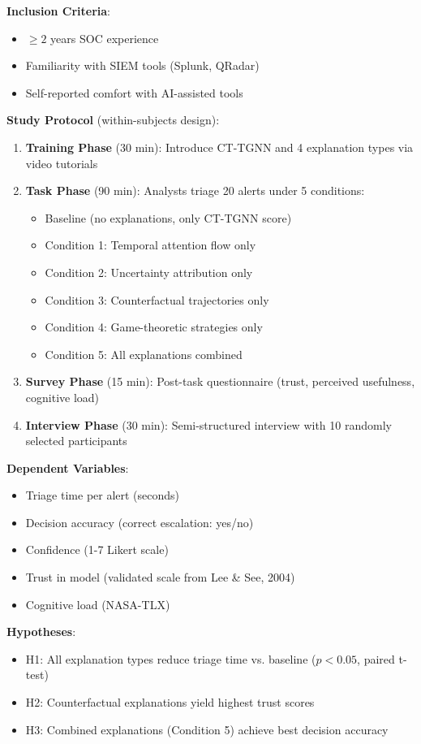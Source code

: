 \documentclass[11pt]{article}
\begin{document}
\textbf{Inclusion Criteria}:
\begin{itemize}
    \item $\geq 2$ years SOC experience
    \item Familiarity with SIEM tools (Splunk, QRadar)
    \item Self-reported comfort with AI-assisted tools
\end{itemize}

\textbf{Study Protocol} (within-subjects design):

\begin{enumerate}
    \item \textbf{Training Phase} (30 min): Introduce CT-TGNN and 4 explanation types via video tutorials
    \item \textbf{Task Phase} (90 min): Analysts triage 20 alerts under 5 conditions:
    \begin{itemize}
        \item Baseline (no explanations, only CT-TGNN score)
        \item Condition 1: Temporal attention flow only
        \item Condition 2: Uncertainty attribution only
        \item Condition 3: Counterfactual trajectories only
        \item Condition 4: Game-theoretic strategies only
        \item Condition 5: All explanations combined
    \end{itemize}
    \item \textbf{Survey Phase} (15 min): Post-task questionnaire (trust, perceived usefulness, cognitive load)
    \item \textbf{Interview Phase} (30 min): Semi-structured interview with 10 randomly selected participants
\end{enumerate}

\textbf{Dependent Variables}:
\begin{itemize}
    \item Triage time per alert (seconds)
    \item Decision accuracy (correct escalation: yes/no)
    \item Confidence (1-7 Likert scale)
    \item Trust in model (validated scale from Lee \& See, 2004)
    \item Cognitive load (NASA-TLX)
\end{itemize}

\textbf{Hypotheses}:
\begin{itemize}
    \item H1: All explanation types reduce triage time vs. baseline ($p < 0.05$, paired t-test)
    \item H2: Counterfactual explanations yield highest trust scores
    \item H3: Combined explanations (Condition 5) achieve best decision accuracy
\end{itemize}
\end{document}
